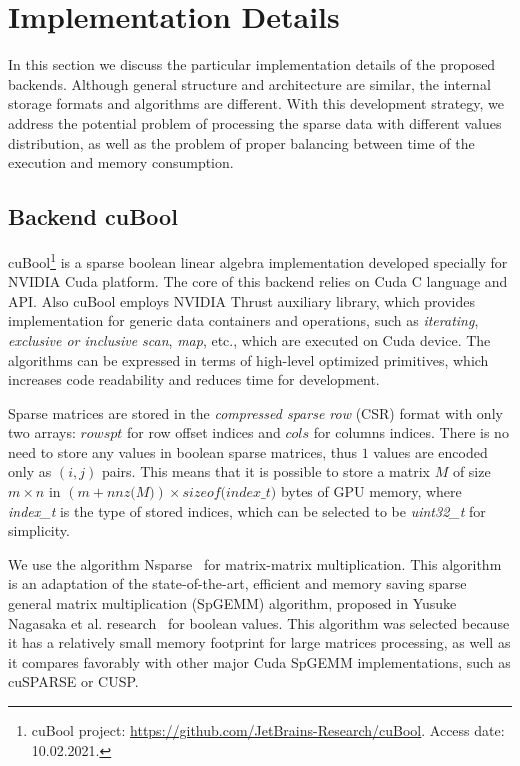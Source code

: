 \section{Implementation Details}

In this section we discuss the particular implementation details of the proposed backends.
Although general structure and architecture are similar, the internal storage formats and algorithms are different.
With this development strategy, we address the potential problem of processing the sparse data with different values distribution, as well as the problem of proper balancing between time of the execution and memory consumption.

\subsection{Backend cuBool}

cuBool\footnote{cuBool project: \url{https://github.com/JetBrains-Research/cuBool}. Access date: 10.02.2021.}
is a sparse boolean linear algebra implementation developed specially for NVIDIA Cuda platform.
The core of this backend relies on Cuda C language and API.
Also cuBool employs NVIDIA Thrust auxiliary library, which provides implementation for generic data containers and operations, such as \textit{iterating}, \textit{exclusive or inclusive scan}, \textit{map}, etc., which are executed on Cuda device.
The algorithms can be expressed in terms of high-level optimized primitives, which increases code readability and reduces time for development.

Sparse matrices are stored in the \textit{compressed sparse row} (CSR) format with only two arrays: $rowspt$ for row offset indices and $cols$ for columns indices.
There is no need to store any values in boolean sparse matrices, thus $1$ values are encoded only as $(i, j)$ pairs.
This means that it is possible to store a matrix $M$ of size $m \times n$ in $(m + \textit{nnz(M)}) \times \textit{sizeof(index\_t)}$ bytes of GPU memory, where \textit{index\_t} is the type of stored indices, which can be selected to be \textit{uint32\_t} for simplicity.

We use the algorithm Nsparse~\cite{inproceedings:cfpq_for_redis_graph} for matrix-matrix multiplication.
This algorithm is an adaptation of the state-of-the-art, efficient and memory saving sparse general matrix multiplication (SpGEMM) algorithm, proposed in Yusuke Nagasaka et al. research~\cite{algo:spgemm:8025284} for boolean values.
This algorithm was selected because it has a relatively small memory footprint for large matrices processing, as well as it compares favorably with other major Cuda SpGEMM implementations, such as cuSPARSE or CUSP.

